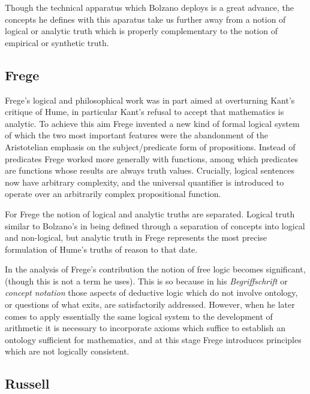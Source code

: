 Though the technical apparatus which Bolzano deploys is a great
advance, the concepts he defines with this aparatus take us further
away from a notion of logical or analytic truth which is properly
complementary to the notion of empirical or synthetic truth.

\subsection{Frege}

Frege's logical and philosophical work was in part aimed at
overturning Kant's critique of Hume, in particular Kant's refusal to
accept that mathematics is analytic.
To achieve this aim Frege invented a new kind of formal logical system
of which the two most important features were the abandonment of the
Aristotelian emphasis on the subject/predicate form of propositions.
Instead of predicates Frege worked more generally with functions, among
which predicates are functions whose results are always truth
values.
Crucially, logical sentences now have arbitrary complexity, and the
universal quantifier is introduced to operate over an arbitrarily
complex propositional function.

For Frege the notion of logical and analytic truths are separated.
Logical truth similar to Bolzano's in being defined through a
separation of concepts into logical and non-logical, but analytic
truth in Frege represents the most precise formulation of Hume's
truths of reason to that date.

In the analysis of Frege's contribution the notion of free logic becomes significant, (though this is not a term he uses).
This is so because in his \emph{Begriffschrift} or \emph{concept notation} those aspects of deductive logic which do not involve ontology, or questions of what exits, are satisfactorily addressed.
However, when he later comes to apply essentially the same logical system to the development of arithmetic it is necessary to incorporate axioms which suffice to establish an ontology sufficient for mathematics, and at this stage Frege introduces principles which are not logically consistent.

\subsection{Russell}

